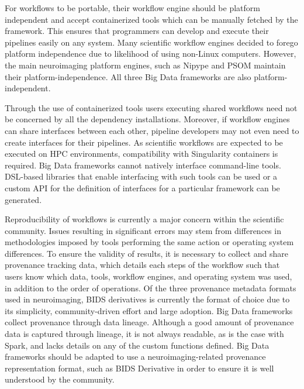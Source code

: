         For workflows to be portable, their workflow engine should be platform
        independent and accept containerized tools which can be manually fetched
        by the framework. This ensures that programmers can develop and execute
        their pipelines easily on any system. Many scientific workflow engines
        decided to forego platform independence due to likelihood of using
        non-Linux computers. However, the main neuroimaging platform engines,
        such as Nipype and PSOM maintain their platform-independence. All three
        Big Data frameworks are also platform-independent.


        Through the use of containerized tools users executing shared workflows
        need not be concerned by all the dependency installations. Moreover, if
        workflow engines can share interfaces between each other, pipeline
        developers may not even need to create interfaces for their pipelines.
        As scientific workflows are expected to be executed on HPC environments,
        compatibility with Singularity containers is required. Big Data
        frameworks cannot natively interface command-line tools. DSL-based
        libraries that enable interfacing with such tools can be used or a
        custom API for the definition of interfaces for a particular framework
        can be generated.


        Reproducibility of workflows is currently a major concern within the
        scientific community. Issues resulting in significant errors may stem
        from differences in methodologies imposed by tools performing the same
        action or operating system differences. To ensure the validity of
        results, it is necessary to collect and share provenance tracking data,
        which details each steps of the workflow such that users know which
        data, tools, workflow engines, and operating system was used, in
        addition to the order of operations. Of the three provenance metadata
        formats used in neuroimaging, BIDS derivatives is currently the format
        of choice due to its simplicity, community-driven effort and large
        adoption. Big Data frameworks collect provenance through data lineage.
        Although a good amount of provenance data is captured through lineage,
        it is not always readable, as is the case with Spark, and lacks details
        on any of the custom functions defined. Big Data frameworks should be
        adapted to use a neuroimaging-related provenance representation format,
        such as BIDS Derivative in order to ensure it is well understood by the
        community.

